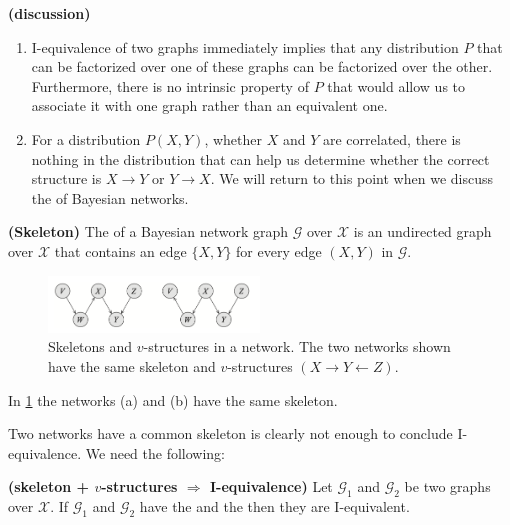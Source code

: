 \documentclass{article}
\newcommand{\bfs}[1]{\textbf{({#1}) }}
\begin{document}
\begin{rema}\bfs{discussion}
\begin{enumerate}
    \item I-equivalence of two graphs immediately implies that any distribution $P$ that can be factorized over one of these graphs can be factorized over the other. Furthermore, there is no intrinsic property of $P$ that would allow us to associate it with one graph rather than an equivalent one. 
    \item {} For a distribution $P(X, Y)$, whether $X$ and $Y$ are correlated, there is nothing in the distribution that can help us determine whether the correct structure is $X \rightarrow Y$ or $Y \rightarrow X$. We will return to this point when we discuss the  of Bayesian networks.
\end{enumerate}
\end{rema}

\begin{defa}\bfs{Skeleton}
The  of a Bayesian network graph $\mathcal{G}$ over $\mathcal{X}$ is an undirected graph over $\mathcal{X}$ that contains an edge $\{X, Y\}$ for every edge $(X, Y)$ in $\mathcal{G}$.
\end{defa}
\begin{figure}[H]
    \centering
    \includegraphics[width=0.5\textwidth]{Figs/a8.png}
    \caption{Skeletons and $v$-structures in a network. The two networks shown have the same skeleton and $v$-structures $(X \rightarrow Y \leftarrow Z)$.}
    \label{fig:gdazhr}
\end{figure}

\begin{exma}
In \cref{fig:gdazhr} the networks (a) and (b) have the same skeleton. 
\end{exma}
Two networks have a common skeleton is clearly not enough to conclude I-equivalence. We need the following:
\begin{thma}\bfs{skeleton + $v$-structures $\Rightarrow$ I-equivalence}
Let $\mathcal{G}_{1}$ and $\mathcal{G}_{2}$ be two graphs over $\mathcal{X}$. If $\mathcal{G}_{1}$ and $\mathcal{G}_{2}$ have the  and the  then they are I-equivalent.
\end{thma}
\end{document}
